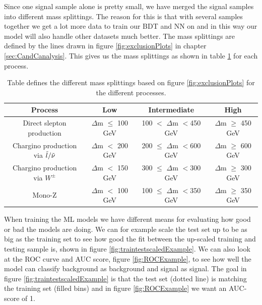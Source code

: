 Since one signal sample alone is pretty small, we have merged the signal samples into different mass splittings. The reason for this is that with several samples together we get a lot more data to train our BDT and NN on and in this way our model will also handle other datasets much better. The mass splittings are defined by the lines drawn in figure \ref{fig:exclusionPlots} in chapter \ref{sec:CandCanalysis}. This gives us the mass splittings as shown in table \ref{tab:massSplittings} for each process.

\begin{table}[H]
    \centering
    \renewcommand{\arraystretch}{1.3}
    \begin{tabular}{c c c c}
    \toprule
        \textbf{Process} & \textbf{Low} & \textbf{Intermediate} & \textbf{High}\\
        \midrule
        \midrule
        Direct slepton production & $\Delta$m $\leq$ 100 GeV & 100 $<$ $\Delta$m $<$450 GeV & $\Delta$m $\geq$ 450 GeV\\
        Chargino production via $\Tilde{l}/\Tilde{\nu}$& $\Delta$m $<$ 200 GeV & 200 $\leq$ $\Delta$m $<$600 GeV & $\Delta$m $\geq$ 600 GeV\\
        Chargino production via $W^\pm$ & $\Delta$m $<$ 150 GeV & 300 $\leq$ $\Delta$m $<$300 GeV & $\Delta$m $\geq$ 300 GeV\\
        Mono-Z & $\Delta$m $<$ 100 GeV & 100 $\leq$ $\Delta$m $<$350 GeV & $\Delta$m $\geq$ 350 GeV\\
        \bottomrule
    \end{tabular}
    \caption{Table defines the different mass splittings based on figure \ref{fig:exclusionPlots} for the different processes.}
    \label{tab:massSplittings}
\end{table}


When training the ML models we have different means for evaluating how good or bad the models are doing. We can for example scale the test set up to be as big as the training set to see how good the fit between the up-scaled training and testing sample is, shown in figure \ref{fig:traintestscaledExample}. We can also look at the ROC curve and AUC score, figure \ref{fig:ROCExample}, to see how well the model can classify background as background and signal as signal. The goal in figure \ref{fig:traintestscaledExample} is that the test set (dotted line) is matching the training set (filled bins) and in figure \ref{fig:ROCExample} we want an AUC-score of 1.

